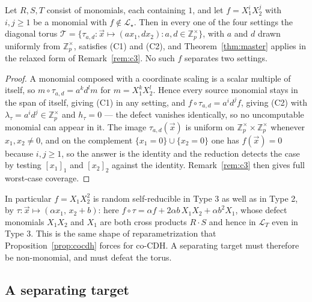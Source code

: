 \documentclass{aicr-solution}
\newcommand{\Zpx}{\mathbb{Z}_p^{\times}}
\newcommand{\vx}{\vec{x}}
\newcommand{\LL}{\mathcal{L}}
\begin{document}
\begin{proposition}
\label{prop:nomono}
Let $R,S,T$ consist of monomials, each containing $1$, and let $f=X_1^{i}X_2^{j}$ with
$i,j\ge 1$ be a monomial with $f\notin\LL_\star$. Then in every one of the four settings the
diagonal torus $\mathcal T=\{\tau_{a,d}\colon\vx\mapsto(ax_1,dx_2):a,d\in\Zpx\}$, with $a$ and
$d$ drawn uniformly from $\Zpx$, satisfies
\textup{(C1)} and \textup{(C2)}, and Theorem~\ref{thm:master} applies in the relaxed form of
Remark~\ref{rem:c3}. No such $f$ separates two settings.
\end{proposition}
\begin{proof}
A monomial composed with a coordinate scaling is a scalar multiple of itself, so
$m\circ\tau_{a,d}=a^{k}d^{l}m$ for $m=X_1^{k}X_2^{l}$. Hence every source monomial stays in
the span of itself, giving (C1) in any setting, and $f\circ\tau_{a,d}=a^{i}d^{j}f$, giving
(C2) with $\lambda_\tau=a^{i}d^{j}\in\Zpx$ and $h_\tau=0$ --- the defect vanishes identically,
so no uncomputable monomial can appear in it. The image $\tau_{a,d}(\vx)$ is uniform on
$\Zpx\times\Zpx$ whenever $x_1,x_2\neq 0$, and on the complement
$\{x_1=0\}\cup\{x_2=0\}$ one has $f(\vx)=0$ because $i,j\ge 1$, so the answer is the identity
and the reduction detects the case by testing $[x_1]_1$ and $[x_2]_2$ against the identity.
Remark~\ref{rem:c3} then gives full worst-case coverage.
\end{proof}

In particular $f=X_1X_2^{2}$ is random self-reducible in Type 3 as well as in Type 2, by
$\tau\colon\vx\mapsto(\alpha x_1,\,x_2+b)$: here $f\circ\tau=\alpha f+2\alpha b\,X_1X_2+
\alpha b^{2}X_1$, whose defect monomials $X_1X_2$ and $X_1$ are both cross products $R\cdot S$
and hence in $\LL_T$ even in Type 3. This is the same shape of reparametrization that
Proposition~\ref{prop:cocdh} forces for co-CDH\@. A separating target must therefore be
non-monomial, and must defeat the torus.

\subsection{A separating target}
\end{document}
